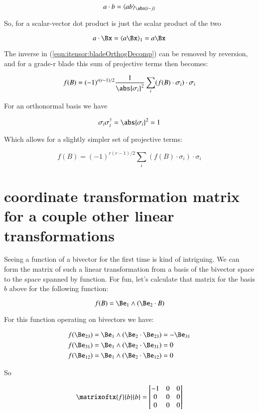 \[
a \cdot b = \langle a b \rangle_{\abs{i-j}}
\]

So, for a scalar-vector dot product is just the scalar product of the two

\[
a \cdot \Bx = \langle{ a \Bx }\rangle_1 = a \Bx
\]

The inverse in (\ref{eqn:itensor:bladeOrthogDecomp}) can be removed by reversion, and for a grade-r blade this sum of projective terms then becomes:

\begin{equation}
f(B) = (-1)^{r(r-1)/2} \frac{1}{{\abs{\sigma_i}}^2}\sum_i (f(B) \cdot \sigma_i) \cdot {\sigma_i}
\end{equation}

For an orthonormal basis we have

\[
\sigma_i \sigma_i^\dagger = \abs{\sigma_i}^2 = 1
\]

Which allows for a slightly simpler set of projective terms:

\begin{equation}
f(B) = (-1)^{r(r-1)/2} \sum_i (f(B) \cdot \sigma_i) \cdot {\sigma_i}
\end{equation}\label{eqn:itensor:OrthonormalDecomp}

\section{coordinate transformation matrix for a couple other linear transformations }

Seeing a function of a bivector for the first time is kind of intriguing.  We can form the matrix of such a linear transformation
from a basis of the bivector space to the space spanned by function.  For fun, let's calculate that matrix for the basis $b$ above
for the following function:

\[
f(B) = \Be_1 \wedge (\Be_2 \cdot B)
\]

For this function operating on  bivectors we have:

\begin{align*}
f(\Be_{23}) &= \Be_1 \wedge (\Be_2 \cdot \Be_{23}) = -\Be_{31} \\
f(\Be_{31}) &= \Be_1 \wedge (\Be_2 \cdot \Be_{31}) = 0 \\
f(\Be_{12}) &= \Be_1 \wedge (\Be_2 \cdot \Be_{12}) = 0 \\
\end{align*}

So

\[
\matrixoftx{f}{b}{b}
= 
\begin{bmatrix}
-1 & 0 & 0 \\
0 & 0 & 0 \\
0 & 0 & 0 \\
\end{bmatrix}
\]

